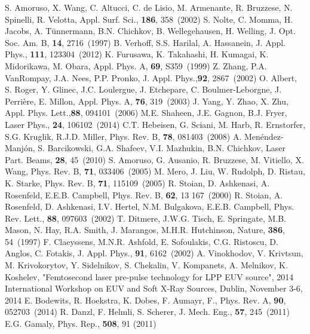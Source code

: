 \documentclass[aip, jap, reprint, amsmath, amssymb]{revtex4-1}
\begin{document}
\begin{thebibliography}{99}
 S. Amoruso, X. Wang, C. Altucci, C. de Lisio, M. Armenante, R. Bruzzese, N. Spinelli, R. Velotta, Appl. Surf. Sci., {\bf186}, 358~(2002)
 S. Nolte, C. Momma, H. Jacobs, A. T{\"u}nnermann, B.N. Chichkov, B. Wellegehausen, H. Welling, J. Opt. Soc. Am. B, {\bf14}, 2716~(1997)
 B. Verhoff, S.S. Harilal, A. Hassanein, J. Appl. Phys., {\bf111}, 123304~(2012)
 K. Furusawa, K. Takahashi, H. Kumagai, K. Midorikawa, M. Obara, Appl. Phys. A, {\bf69}, S359~(1999)
 Z. Zhang, P.A. VanRompay, J.A. Nees, P.P. Pronko, J. Appl. Phys.,{\bf92}, 2867~(2002)
 O. Albert, S. Roger, Y. Glinec, J.C. Loulergue, J. Etchepare, C. Boulmer-Leborgne, J. Perri{\`e}re, E. Millon, Appl. Phys. A, {\bf76}, 319~(2003)
 J. Yang, Y. Zhao, X. Zhu, Appl. Phys. Lett.,{\bf88}, 094101~(2006)
 M.E. Shaheen, J.E. Gagnon, B.J. Fryer, Laser Phys., {\bf24}, 106102~(2014)
 C.T. Hebeisen, G. Sciani, M. Harb, R. Ernstorfer, S.G. Kruglik, R.J.D. Miller, Phys. Rev. B, {\bf78}, 081403~(2008)
 A. Men{\'e}ndez-Manj{\'o}n, S. Barcikowski, G.A. Shafeev, V.I. Mazhukin, B.N. Chichkov, Laser Part. Beams, {\bf28}, 45~(2010)
 S. Amoruso, G. Ausanio, R. Bruzzese, M. Vitiello, X. Wang, Phys. Rev. B, {\bf71}, 033406~(2005)
 M. Mero, J. Liu, W. Rudolph, D. Ristau, K. Starke, Phys. Rev. B, {\bf71}, 115109~(2005)
 R. Stoian, D. Ashkenasi, A. Rosenfeld, E.E.B. Campbell, Phys. Rev. B, {\bf62}, 13 167~(2000)
 R. Stoian, A. Rosenfeld, D. Ashkenasi, I.V. Hertel, N.M. Bulgakova, E.E.B. Campbell, Phys. Rev. Lett., {\bf88}, 097603~(2002)
 T. Ditmere, J.W.G. Tisch, E. Springate, M.B. Mason, N. Hay, R.A. Smith, J. Marangos, M.H.R. Hutchinson, Nature, {\bf386}, 54~(1997)
 F. Claeyssens, M.N.R. Ashfold, E. Sofoulakis, C.G. Ristoscu, D. Anglos, C. Fotakis, J. Appl. Phys., {\bf91}, 6162~(2002)
 A. Vinokhodov, V. Krivtsun, M. Krivokorytov, Y. Sidelnikov, S. Chekalin, V. Kompanets, A. Melnikov, K. Koshelev, {"Femtosecond laser pre-pulse technology for {LPP} {EUV} source"}, {2014 International Workshop on EUV and Soft X-Ray Sources}, Dublin, {November 3-6}, 2014
 E. Bodewits, R. Hoekstra, K. Dobes, F. Aumayr, F., Phys. Rev. A, {\bf90}, 052703~(2014)
 R. Danzl, F. Helmli, S. Scherer, J. Mech. Eng., {\bf57}, 245~(2011)
 E.G. Gamaly, Phys. Rep., {\bf508}, 91 (2011)

\end{thebibliography}
\end{document}
